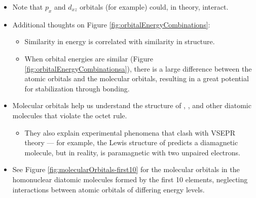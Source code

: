 \documentclass[../notes.tex]{subfiles}
\begin{document}
\begin{itemize}
    \item Note that $p_x$ and $d_{xz}$ orbitals (for example) could, in theory, interact.
    \item Additional thoughts on Figure \ref{fig:orbitalEnergyCombinations}:
    \begin{itemize}
        \item Similarity in energy is correlated with similarity in structure.
        \item When orbital energies are similar (Figure \ref{fig:orbitalEnergyCombinationsa}), there is a large difference between the atomic orbitals and the molecular orbitals, resulting in a great potential for stabilization through bonding.
    \end{itemize}
    \item Molecular orbitals help us understand the structure of , , and other diatomic molecules that violate the octet rule.
    \begin{itemize}
        \item They also explain experimental phenomena that clash with VSEPR theory --- for example, the Lewis structure of  predicts a diamagnetic molecule, but in reality,  is paramagnetic with two unpaired electrons.
    \end{itemize}
    \item See Figure \ref{fig:molecularOrbitals-first10} for the molecular orbitals in the homonuclear diatomic molecules formed by the first 10 elements, neglecting interactions between atomic orbitals of differing energy levels.
    \begin{figure}[h!]
        \centering
\end{figure}
\end{itemize}
\end{document}
